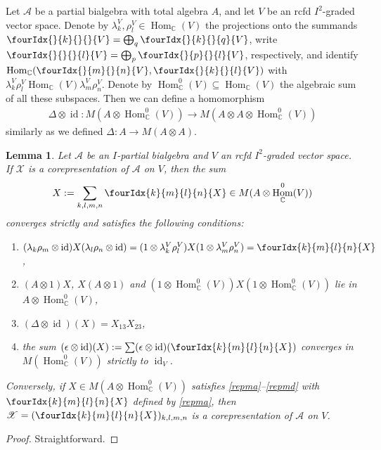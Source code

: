 \documentclass[11pt]{article}
\DeclareMathOperator{\id}{id}
\DeclareMathOperator{\Hom}{Hom}
\newcommand{\C}{\mathbb{C}}
\newcommand{\Gr}[5]{\fourIdx{#2}{#4}{#3}{#5}{#1}}%
\newcommand{\Gru}[3]{\Gr{#1}{}{}{#2}{#3}}
\newtheorem{Lem}[Theorem]{Lemma}
\theoremstyle{definition}
\numberwithin{equation}{section}
\begin{document}
Let $\mathscr{A}$ be a partial bialgebra with total algebra $A$, and
let $V$ be an rcfd $I^{2}$-graded vector space.
Denote by $\lambda^{V}_{k},\rho^{V}_{l} \in \Hom_{\C}(V)$ the
projections onto the summands $\Gru{V}{k}{} = \bigoplus_{q}
\Gru{V}{k}{q}$, write $\Gru{V}{}{l}=\bigoplus_{p}\Gru{V}{p}{l}$,
respectively, and identify $\Hom_{\C}(\Gru{V}{m}{n},\Gru{V}{k}{l})$ with
$\lambda^{V}_{k}\rho^{V}_{l}\Hom_{\C}(V)\lambda^{V}_{m}\rho^{V}_{n}$. Denote by $\Hom_{\C}^{0}(V) \subseteq \Hom_{\C}(V)$ the algebraic sum of all
these subspaces. Then we can define a homomorphism
\begin{align*}
  \Delta \otimes \id \colon M(A \otimes \Hom_{\C}^{0}(V)) \to M(A
  \otimes A \otimes \Hom_{\C}^{0}(V))
\end{align*}
similarly as we defined $ \Delta \colon A \to M(A\otimes A)$.
\begin{Lem} \label{lemma:rep-multiplier}
  Let  $\mathscr{A}$ be an $I$-partial bialgebra and $V$  an rcfd $I^{2}$-graded vector space.  If $\mathscr{X}$ is a
  corepresentation of  $\mathscr{A}$ on $V$, then the sum
  \begin{align}
    \label{eq:rep-multiplier}
  X:=\sum_{k,l,m,n} \Gr{X}{k}{l}{m}{n} \in  M(A
  \otimes \Hom_{\C}^{0}(V))
  \end{align}
 converges strictly and satisfies the following conditions:
  \begin{enumerate}[label=(\arabic*)] 
  \item\label{repma} $(\lambda_{k}\rho_{m} \otimes \id){X}(\lambda_{l}\rho_{n}
    \otimes \id) = (1 \otimes \lambda^{V}_{k}\rho^{V}_{l}){X}(1 \otimes
    \lambda^{V}_{m}\rho^{V}_{n}) = \Gr{X}{k}{l}{m}{n}$,
  \item\label{repmb} $(A \otimes 1){X}$, $ {X}(A \otimes 1)$ and $(1 \otimes
    \Hom^{0}_{\C}(V))X(1 \otimes \Hom^{0}_{\C}(V))$ lie in $A \otimes \Hom_{\C}^{0}(V)$,
  \item\label{repmc} $(\Delta\otimes \id)(X)=X_{13}X_{23}$, 
  \item\label{repmd} the sum $(\epsilon \otimes \id)({X}) :=\sum (\epsilon \otimes
    \id)(\Gr{X}{k}{l}{m}{n})$ converges in $M(\Hom^{0}_{\C}(V))$ strictly
    to $\id_{V}$.
  \end{enumerate}
  Conversely, if $ X \in M(A \otimes \Hom_{\C}^{0}(V))$ satisfies
  \ref{repma}--\ref{repmd} with $\Gr{X}{k}{l}{m}{n}$ defined by \ref{repma}, then
  $\mathscr{X}=(\Gr{X}{k}{l}{m}{n})_{k,l,m,n}$ is a corepresentation
  of $\mathscr{A}$ on $V$.
\end{Lem}
\begin{proof}
 Straightforward.
\end{proof}
\end{document}
